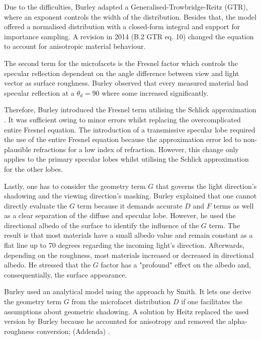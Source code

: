 Due to the difficulties, Burley adapted a Generalised-Trowbridge-Reitz (GTR), where an exponent controls the width of the distribution.
Besides that, the model offered a normalised distribution with a closed-form integral and support for importance sampling.
A revision in 2014 (B.2 GTR eq. 10) \cite{burley_physically_2012} changed the equation to account for anisotropic material behaviour.

The second term for the microfacets is the Fresnel factor which controls the specular reflection dependent on the angle difference between view and light vector as surface roughness.
Burley observed that every measured material had specular reflection at a $\theta_d=90$ where some increased significantly.

Therefore, Burley \cite{burley_physically_2012} introduced the Fresnel term utilising the Schlick approximation \cite{schlick_inexpensive_1994}.
It was sufficient owing to minor errors whilst replacing the overcomplicated entire Fresnel equation.
The introduction of a transmissive specular lobe \cite{burley_extending_2015} required the use of the entire Fresnel equation because the approximation error led to non-plausible refractions for a low index of refraction.
However, this change only applies to the primary specular lobes whilst utilising the Schlick approximation for the other lobes.

Lastly, one has to consider the geometry term $G$ that governs the light direction's shadowing and the viewing direction's masking.
Burley explained \cite{burley_physically_2012} that one cannot directly evaluate the $G$ term because it demands accurate $D$ and $F$ terms as well as a clear separation of the diffuse and specular lobe.
However, he used the directional albedo of the surface to identify the influence of the $G$ term.
The result is that most materials have a small albedo value and remain constant as a flat line up to 70 degrees regarding the incoming light's direction.
Afterwards, depending on the roughness, most materials increased or decreased in directional albedo.
He stressed that the $G$ factor has a "profound" effect on the albedo and, consequentially, the surface appearance.

Burley used an analytical model using the approach by Smith. 
It lets one derive the geometry term $G$ from the microfacet distribution $D$ if one facilitates the assumptions about geometric shadowing.
A solution by Heitz \cite{heitz_understanding_2014} replaced the used version by Burley because he accounted for anisotropy and removed the alpha-roughness conversion; (Addenda) \cite{burley_physically_2012}.

